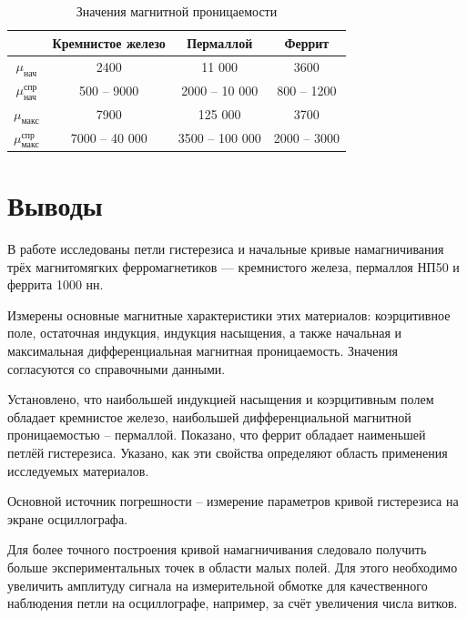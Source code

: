 \documentclass[12pt]{extarticle}
\begin{document}
		
		
		\begin{table}
			\caption{Значения магнитной проницаемости}
			\centering
			\begin{tabular}{|c|c|c|c|}
				\hline
				& Кремнистое железо & Пермаллой & Феррит \\
				\hline
				$\mu_{\text{нач}}$ & 2400 & 11 000 & 3600  \\
				\hline
				$\mu^{\text{спр}}_{\text{нач}}$ & 500 -- 9000 & 2000 -- 10 000 & 800 -- 1200 \\
				\hline
				$\mu_{\text{макс}}$&  7900 & 125 000 & 3700 \\
				\hline
				$\mu^{\text{спр}}_{\text{макс}}$ & 7000 -- 40 000& 3500 -- 100 000 & 2000 -- 3000 \\
				\hline
			\end{tabular}
			
		\end{table}
		
\section{Выводы}

	\hspace{4mm} В работе исследованы петли гистерезиса и начальные кривые намагничивания трёх магнитомягких ферромагнетиков — кремнистого железа, пермаллоя НП50 и феррита 1000 нн. 
	
	Измерены основные магнитные характеристики этих материалов: коэрцитивное поле, остаточная индукция, индукция насыщения, а также начальная и максимальная дифференциальная магнитная проницаемость. Значения согласуются со справочными данными.
	
	Установлено, что наибольшей индукцией насыщения и коэрцитивным полем обладает кремнистое железо, наибольшей дифференциальной магнитной проницаемостью -- пермаллой. Показано, что феррит обладает наименьшей петлёй гистерезиса. Указано, как эти свойства определяют область применения исследуемых материалов.
	
	Основной источник погрешности -- измерение параметров кривой гистерезиса на экране осциллографа.
	
	Для более точного построения кривой намагничивания следовало получить больше экспериментальных точек в области малых полей. Для этого необходимо увеличить амплитуду сигнала на измерительной обмотке для качественного наблюдения петли на осциллографе, например, за счёт увеличения числа витков.
\end{document}

